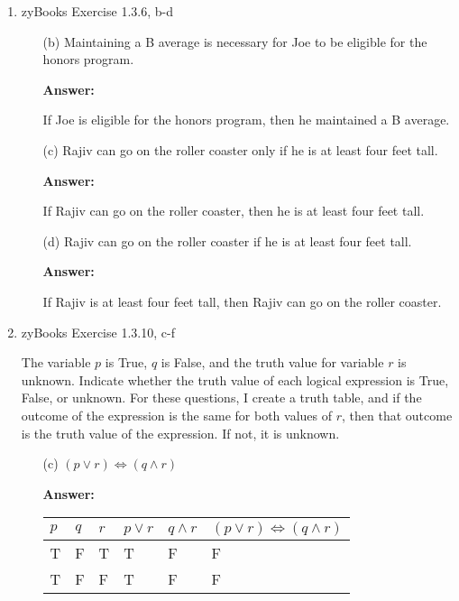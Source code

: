 \documentclass[12pt]{extreport}
\newcommand{\answer}[0]{\medskip \textbf{Answer:} \medskip}
\begin{document}
\begin{enumerate}
    
    \item zyBooks Exercise 1.3.6, b-d
    
        \begin{enumerate}

            \item[(b)] Maintaining a B average is necessary for Joe to be eligible for the honors program.
            
                \answer

                If Joe is eligible for the honors program, then he maintained a B average.

            \item[(c)] Rajiv can go on the roller coaster only if he is at least four feet tall.
            
                \answer

                If Rajiv can go on the roller coaster, then he is at least four feet tall.

            \item[(d)] Rajiv can go on the roller coaster if he is at least four feet tall.
            
                \answer

                If Rajiv is at least four feet tall, then Rajiv can go on the roller coaster.
            
        \end{enumerate}

    \item zyBooks Exercise 1.3.10, c-f
    
    The variable \( p \) is True, \( q \) is False, and the truth value for variable \( r \) is unknown. Indicate whether the truth value of each logical expression is True, False, or unknown. For these questions, I create a truth table, and if the outcome of the expression is the same for both values of \( r \), then that outcome is the truth value of the expression. If not, it is unknown. 
    
        \begin{enumerate}
            
            \item[(c)] \( (p \lor r) \iff (q \land r) \)
            
                \answer

                \begin{tabular}{|l|l|l|l|l|l|}
                    \hline
                    \( p \) & \( q \) & \( r \) & \( p \lor r \) & \( q \land r \) & \( (p \lor r) \iff (q \land r) \) \\ \hline
                    T & F & T & T & F & F \\ \hline
                    T & F & F & T & F & F \\ \hline
                \end{tabular}


\end{enumerate}
\end{enumerate}
\end{document}
